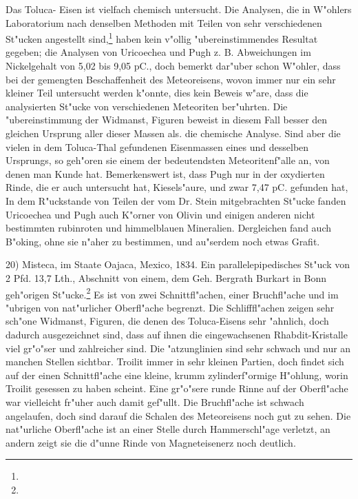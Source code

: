 \documentclass[a4paper, 11pt, oneside]{article}
\begin{document}
Das Toluca- Eisen ist vielfach chemisch untersucht. Die Analysen, die in W"ohlers Laboratorium nach denselben Methoden mit Teilen von sehr verschiedenen St"ucken angestellt sind,\footnote{} haben kein v"ollig "ubereinstimmendes Resultat gegeben; die Analysen von Uricoechea und Pugh z. B. Abweichungen im Nickelgehalt von 5,02 bis 9,05 pC., doch bemerkt dar"uber schon W"ohler, dass bei der gemengten Beschaffenheit des Meteoreisens, wovon immer nur ein sehr kleiner Teil untersucht werden k"onnte, dies kein Beweis w"are, dass die analysierten St"ucke von verschiedenen Meteoriten ber"uhrten. Die "ubereinstimmung der Widmanst, Figuren beweist in diesem Fall besser den gleichen Ursprung aller dieser Massen als. die chemische Analyse. Sind aber die vielen in dem Toluca-Thal gefundenen Eisenmassen eines und desselben Ursprungs, so geh"oren sie einem der bedeutendsten Meteoritenf"alle an, von denen man Kunde hat. Bemerkenswert ist, dass Pugh nur in der oxydierten Rinde, die er auch untersucht hat, Kiesels"aure, und zwar 7,47 pC. gefunden hat, In dem R"uckstande von Teilen der vom Dr. Stein mitgebrachten St"ucke fanden Uricoechea und Pugh auch K"orner von Olivin und einigen anderen nicht bestimmten rubinroten und himmelblauen Mineralien. Dergleichen fand auch B"oking, ohne sie n"aher zu bestimmen, und au"serdem noch etwas Grafit.

20) Misteca, im Staate Oajaca, Mexico, 1834. Ein parallelepipedisches St"uck von 2 Pfd. 13,7 Lth., Abschnitt von einem, dem Geh. Bergrath Burkart in Bonn geh"origen St"ucke.\footnote{} Es ist von zwei Schnittfl"achen, einer Bruchfl"ache und im "ubrigen von nat"urlicher Oberfl"ache begrenzt. Die Schlifffl"achen zeigen sehr sch"one Widmanst, Figuren, die denen des Toluca-Eisens sehr "ahnlich, doch dadurch ausgezeichnet sind, dass auf ihnen die eingewachsenen Rhabdit-Kristalle viel gr"o"ser und zahlreicher sind. Die "atzunglinien sind sehr schwach und nur an manchen Stellen sichtbar. Troilit immer in sehr kleinen Partien, doch findet sich auf der einen Schnittfl"ache eine kleine, krumm zylinderf"ormige H"ohlung, worin Troilit gesessen zu haben scheint. Eine gr"o"sere runde Rinne auf der Oberfl"ache war vielleicht fr"uher auch damit gef"ullt. Die Bruchfl"ache ist schwach angelaufen, doch sind darauf die Schalen des Meteoreisens noch gut zu sehen. Die nat"urliche Oberfl"ache ist an einer Stelle durch Hammerschl"age verletzt, an andern zeigt sie die d"unne Rinde von Magneteisenerz noch deutlich.
\end{document}
